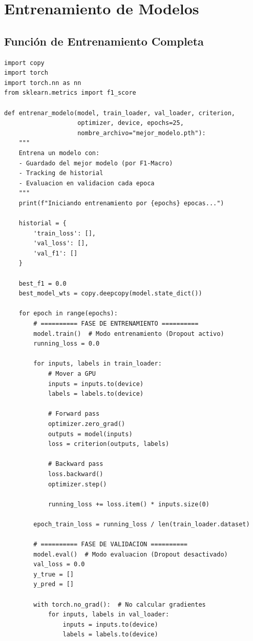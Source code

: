 \documentclass[12pt,a4paper]{article}
\begin{document}
\section{Entrenamiento de Modelos}

\subsection{Función de Entrenamiento Completa}

\begin{lstlisting}[caption={Loop de entrenamiento con todas las mejoras}]
import copy
import torch
import torch.nn as nn
from sklearn.metrics import f1_score

def entrenar_modelo(model, train_loader, val_loader, criterion,
                    optimizer, device, epochs=25,
                    nombre_archivo="mejor_modelo.pth"):
    """
    Entrena un modelo con:
    - Guardado del mejor modelo (por F1-Macro)
    - Tracking de historial
    - Evaluacion en validacion cada epoca
    """
    print(f"Iniciando entrenamiento por {epochs} epocas...")

    historial = {
        'train_loss': [],
        'val_loss': [],
        'val_f1': []
    }

    best_f1 = 0.0
    best_model_wts = copy.deepcopy(model.state_dict())

    for epoch in range(epochs):
        # ========== FASE DE ENTRENAMIENTO ==========
        model.train()  # Modo entrenamiento (Dropout activo)
        running_loss = 0.0

        for inputs, labels in train_loader:
            # Mover a GPU
            inputs = inputs.to(device)
            labels = labels.to(device)

            # Forward pass
            optimizer.zero_grad()
            outputs = model(inputs)
            loss = criterion(outputs, labels)

            # Backward pass
            loss.backward()
            optimizer.step()

            running_loss += loss.item() * inputs.size(0)

        epoch_train_loss = running_loss / len(train_loader.dataset)

        # ========== FASE DE VALIDACION ==========
        model.eval()  # Modo evaluacion (Dropout desactivado)
        val_loss = 0.0
        y_true = []
        y_pred = []

        with torch.no_grad():  # No calcular gradientes
            for inputs, labels in val_loader:
                inputs = inputs.to(device)
                labels = labels.to(device)


\end{lstlisting}
\end{document}
